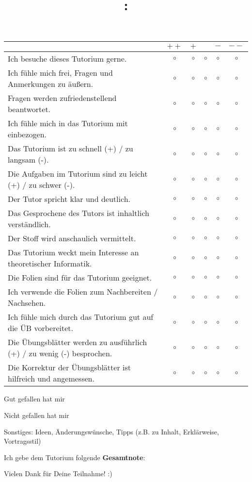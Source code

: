 \documentclass[%
  parskip,
  a4paper, %
  fontsize=12pt, %
]{scrartcl}
\title{\getTopic : \getTitle}
\date{\getDate}
\author{\getAuthor}
\begin{document}
\newcommand{\punkte}{& $\circ$ & $\circ$ & $\circ$ & $\circ$ & $\circ$ \\}
\begin{tabularx}{\textwidth}{X|ccccc}
\hfill & $++$ & $+$ & & $-$ & $--$ \\
\midrule
Ich besuche dieses Tutorium gerne. \punkte
Ich fühle mich frei, Fragen und Anmerkungen zu äußern. \punkte
Fragen werden zufriedenstellend beantwortet. \punkte
Ich fühle mich in das Tutorium mit einbezogen. \punkte
Das Tutorium ist zu schnell (+) / zu langsam (-). \punkte
Die Aufgaben im Tutorium sind zu leicht (+) / zu schwer (-). \punkte
Der Tutor spricht klar und deutlich. \punkte
Das Gesprochene des Tutors ist inhaltlich verständlich. \punkte
Der Stoff wird anschaulich vermittelt. \punkte
Das Tutorium weckt mein Interesse an theoretischer Informatik. \punkte
Die Folien sind für das Tutorium geeignet. \punkte
Ich verwende die Folien zum Nachbereiten / Nachsehen. \punkte
Ich fühle mich durch das Tutorium gut auf die ÜB vorbereitet. \punkte
\footnotesize Die Übungsblätter werden zu ausführlich (+) / zu wenig (-) besprochen. \punkte
Die Korrektur der Übungsblätter ist hilfreich und angemessen. \punkte
\end{tabularx}

\small Gut gefallen hat mir
\begin{framed}
  \hfill\vspace{2.5cm}
\end{framed}

\small Nicht gefallen hat mir
\begin{framed}
  \hfill\vspace{2.5cm}
\end{framed}

\small Sonstiges: Ideen, Änderungswünsche, Tipps (z.B. zu Inhalt, Erklärweise, Vortragsstil)
\begin{framed}
  \hfill\vspace{2.5cm}
\end{framed}

Ich gebe dem Tutorium folgende \textbf{Gesamtnote}:

Vielen Dank für Deine Teilnahme! :)
\end{document}
